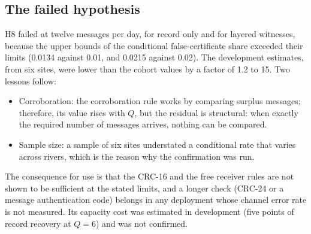 \subsection{The failed hypothesis}
H8 failed at twelve messages per day, for record only and for layered witnesses, because the upper bounds of the conditional false-certificate share exceeded their limits (0.0134 against 0.01, and 0.0215 against 0.02). The development estimates, from six sites, were lower than the cohort values by a factor of 1.2 to 15. Two lessons follow:
\begin{itemize}
  \item Corroboration: the corroboration rule works by comparing surplus messages; therefore, its value rises with $Q$, but the residual is structural: when exactly the required number of messages arrives, nothing can be compared.
  \item Sample size: a sample of six sites understated a conditional rate that varies across rivers, which is the reason why the confirmation was run.
\end{itemize} The consequence for use is that the CRC-16 and the free receiver rules are not shown to be sufficient at the stated limits, and a longer check (CRC-24 or a message authentication code) belongs in any deployment whose channel error rate is not measured. Its capacity cost was estimated in development (five points of record recovery at $Q = 6$) and was not confirmed.

